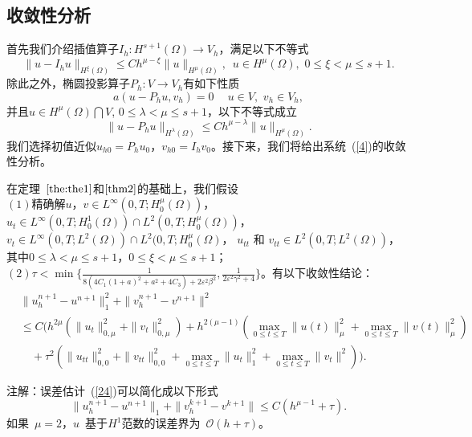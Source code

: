 \documentclass[twoside,UTF8]{nputhesis}
\begin{document}
\subsection{收敛性分析}
首先我们介绍插值算子$I_h :H^{s+1}(\Omega)\rightarrow V_h$，满足以下不等式 \cite{b1994}
\begin{equation}
\| u-I_hu\|_{H^\xi(\Omega)}\leq Ch^{\mu-\xi}\| u\|_{H^\mu(\Omega)}, \,\,\, u\in H^{\mu}(\Omega),\,\, 0\leq\xi<\mu\leq s+1.
\label{21}
\end{equation}
除此之外，椭圆投影算子$P_h:V\longrightarrow V_h$有如下性质\cite{CiarletPG}
\begin{equation}
a(u-P_hu,v_h)=0 \quad ~u\in V, \,\,v_h\in V_h,
\label{22}
\end{equation}
并且$u\in H^\mu(\Omega)\bigcap V$, $0\leq\lambda<\mu\leq s+1$，以下不等式成立
\begin{equation*}
\| u-P_hu\|_{H^\lambda(\Omega)}\leq Ch^{\mu-\lambda}\| u\|_{H^\mu(\Omega)}.
\label{23}
\end{equation*}
我们选择初值近似$u_{h0}=P_hu_0$，$v_{h0}=I_hv_0$。接下来，我们将给出系统~(\ref{4})的收敛性分析。
\begin{theorem}[收敛性~I]
	在定理~$\ref{the:the1}$和$\ref{thm2}$的基础上，我们假设 \\
	$(1)$\quad 精确解$u$，$v\in L^{\infty}(0,T;H^\mu_0(\Omega))$， $u_t\in L^\infty(0,T;H^1_0(\Omega))\cap L^2(0,T;H^\mu_0(\Omega))$， $v_t\in L^\infty(0,T;L^2(\Omega))\cap L^2(0,T;H^\mu_0(\Omega)$， $u_{tt}$ 和 $v_{tt}\in L^2(0,T;L^2(\Omega))$， 其中$0\leq\lambda<\mu\leq {s+1}$，$0\leq\xi<\mu\leq {s+1}$；\\
	$(2)$\quad $\tau<\min\{\frac{1}{8(4C_1(1+a)^2+a^2+4C_3)+2\varepsilon^2\beta^2},\frac{1}{2\varepsilon^2\gamma^2+4}\}$。有以下收敛性结论： \\
	\begin{equation}
	\begin{split}
	&\| u^{n+1}_h-u^{n+1}\|^2_1+\| v^{n+1}_h-v^{n+1}\|^2\\
	&\leq C\Big(h^{2\mu}(\| u_t\|^2_{0,\mu}+\| v_t\|^2_{0,\mu})+h^{2(\mu-1)}(\max\limits_{0\leq t\leq T}\| u(t)\|^2_\mu+\max\limits_{0\leq t\leq T}\| v(t)\|^2_\mu)\\
	&\quad +\tau^2(\| u_{tt}\|^2_{0,0}+\| v_{tt}\|^2_{0,0}+\max_{0\leq t\leq T}\| u_t\|^2_1+\max_{0\leq t\leq T}\| v_t\|^2)\Big).
	\label{24}
	\end{split}
	\end{equation}
	\label{thm3}
\end{theorem}
注解：误差估计~(\ref{24})可以简化成以下形式
\begin{equation}\label{eq:12}
\| u^{n+1}_h-u^{n+1}\|_1+\| v^{k+1}_h-v^{k+1}\|\leq C(h^{\mu-1}+\tau).
\end{equation}
如果~$\mu=2$，$u$~基于$H^1$范数的误差界为~$\mathcal {O}(h+\tau)$。
\end{document}
